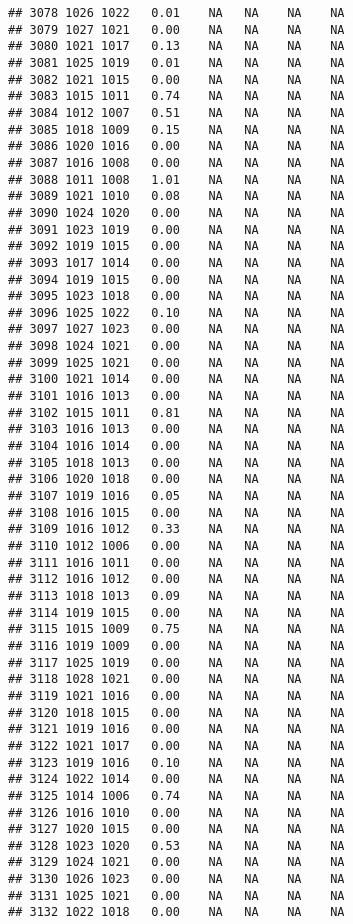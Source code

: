 \documentclass{article}\usepackage{graphicx, color}
\makeatletter
\newenvironment{kframe}{%
 \def\at@end@of@kframe{}%
 \ifinner\ifhmode%
  \def\at@end@of@kframe{\end{minipage}}%
  \begin{minipage}{\columnwidth}%
 \fi\fi%
 \def\FrameCommand##1{\hskip\@totalleftmargin \hskip-\fboxsep
 \colorbox{shadecolor}{##1}\hskip-\fboxsep
     \hskip-\linewidth \hskip-\@totalleftmargin \hskip\columnwidth}%
 \MakeFramed {\advance\hsize-\width
   \@totalleftmargin\z@ \linewidth\hsize
   \@setminipage}}%
 {\par\unskip\endMakeFramed%
 \at@end@of@kframe}
\newenvironment{knitrout}{}{} %
\makeatother
\begin{document}
\begin{knitrout}
\begin{kframe}
\begin{verbatim}
## 3078 1026 1022   0.01    NA   NA    NA    NA
## 3079 1027 1021   0.00    NA   NA    NA    NA
## 3080 1021 1017   0.13    NA   NA    NA    NA
## 3081 1025 1019   0.01    NA   NA    NA    NA
## 3082 1021 1015   0.00    NA   NA    NA    NA
## 3083 1015 1011   0.74    NA   NA    NA    NA
## 3084 1012 1007   0.51    NA   NA    NA    NA
## 3085 1018 1009   0.15    NA   NA    NA    NA
## 3086 1020 1016   0.00    NA   NA    NA    NA
## 3087 1016 1008   0.00    NA   NA    NA    NA
## 3088 1011 1008   1.01    NA   NA    NA    NA
## 3089 1021 1010   0.08    NA   NA    NA    NA
## 3090 1024 1020   0.00    NA   NA    NA    NA
## 3091 1023 1019   0.00    NA   NA    NA    NA
## 3092 1019 1015   0.00    NA   NA    NA    NA
## 3093 1017 1014   0.00    NA   NA    NA    NA
## 3094 1019 1015   0.00    NA   NA    NA    NA
## 3095 1023 1018   0.00    NA   NA    NA    NA
## 3096 1025 1022   0.10    NA   NA    NA    NA
## 3097 1027 1023   0.00    NA   NA    NA    NA
## 3098 1024 1021   0.00    NA   NA    NA    NA
## 3099 1025 1021   0.00    NA   NA    NA    NA
## 3100 1021 1014   0.00    NA   NA    NA    NA
## 3101 1016 1013   0.00    NA   NA    NA    NA
## 3102 1015 1011   0.81    NA   NA    NA    NA
## 3103 1016 1013   0.00    NA   NA    NA    NA
## 3104 1016 1014   0.00    NA   NA    NA    NA
## 3105 1018 1013   0.00    NA   NA    NA    NA
## 3106 1020 1018   0.00    NA   NA    NA    NA
## 3107 1019 1016   0.05    NA   NA    NA    NA
## 3108 1016 1015   0.00    NA   NA    NA    NA
## 3109 1016 1012   0.33    NA   NA    NA    NA
## 3110 1012 1006   0.00    NA   NA    NA    NA
## 3111 1016 1011   0.00    NA   NA    NA    NA
## 3112 1016 1012   0.00    NA   NA    NA    NA
## 3113 1018 1013   0.09    NA   NA    NA    NA
## 3114 1019 1015   0.00    NA   NA    NA    NA
## 3115 1015 1009   0.75    NA   NA    NA    NA
## 3116 1019 1009   0.00    NA   NA    NA    NA
## 3117 1025 1019   0.00    NA   NA    NA    NA
## 3118 1028 1021   0.00    NA   NA    NA    NA
## 3119 1021 1016   0.00    NA   NA    NA    NA
## 3120 1018 1015   0.00    NA   NA    NA    NA
## 3121 1019 1016   0.00    NA   NA    NA    NA
## 3122 1021 1017   0.00    NA   NA    NA    NA
## 3123 1019 1016   0.10    NA   NA    NA    NA
## 3124 1022 1014   0.00    NA   NA    NA    NA
## 3125 1014 1006   0.74    NA   NA    NA    NA
## 3126 1016 1010   0.00    NA   NA    NA    NA
## 3127 1020 1015   0.00    NA   NA    NA    NA
## 3128 1023 1020   0.53    NA   NA    NA    NA
## 3129 1024 1021   0.00    NA   NA    NA    NA
## 3130 1026 1023   0.00    NA   NA    NA    NA
## 3131 1025 1021   0.00    NA   NA    NA    NA
## 3132 1022 1018   0.00    NA   NA    NA    NA

\end{verbatim}
\end{kframe}
\end{knitrout}
\end{document}
